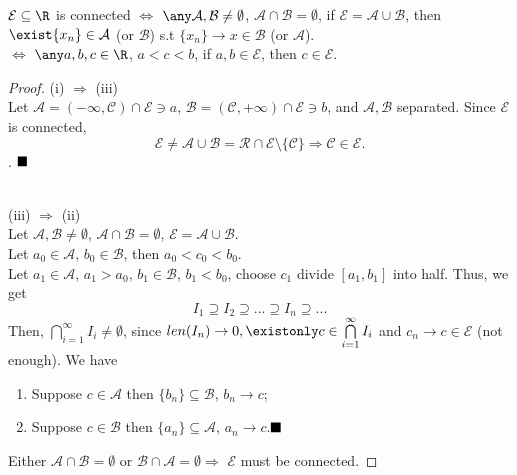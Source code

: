 \begin{theorem}
    $\mathcal{E} \subseteq \R$ is connected  $\Leftrightarrow$ $\any \mathcal{A,B} \neq \emptyset$, $\mathcal{A} \cap \mathcal{B} = \emptyset$, if $\mathcal{E} = \mathcal{A} \cup \mathcal{B}$, then $\exist \{ x_n \} \in \mathcal{A}$ (or $\mathcal{B}$) s.t $\{ x_n \} \rightarrow x \in \mathcal{B}$ (or $\mathcal{A}$).\\
    \indent \indent \indent \indent \indent \indent \indent \indent$\Leftrightarrow$ $\any a,b,c \in \R$, $a<c<b$, if $a,b \in \mathcal{E}$, then $c \in \mathcal{E}$.
\end{theorem}
\begin{proof}
    (i) $\Rightarrow$ (iii) \\
    Let $\mathcal{A} =  (-\infty, \mathcal{C}) \cap \mathcal{E} \ni a$, $\mathcal{B} = (\mathcal{C}, +\infty) \cap \mathcal{E} \ni b$, and $\mathcal{A, B}$ separated. Since $\mathcal{E}$ is connected, 
    \[
    \mathcal{E} \neq \mathcal{A} \cup \mathcal{B} = \mathcal{R} \cap \mathcal{E} \setminus \{\mathcal{C}\} \Rightarrow \mathcal{C} \in \mathcal{E}.
    \]. $\hfill\blacksquare$

\\
    (iii) $\Rightarrow$ (ii)\\
    Let $\mathcal{A, B} \neq \emptyset$, $\mathcal{A} \cap \mathcal{B} = \emptyset$, $\mathcal{E} = \mathcal{A} \cup \mathcal{B}$. \\
    Let $a_0 \in \mathcal{A}$, $b_0 \in \mathcal{B}$, then $a_0<c_0<b_0$. \\
    Let $a_1 \in \mathcal{A}$, $a_1>a_0$, $b_1 \in \mathcal{B}$, $b_1<b_0$, choose $c_1$ divide $[a_1,b_1]$ into half. Thus, we get
    \[
        I_1 \supseteq I_2 \supseteq...\supseteq I_n \supseteq...
    \]
    Then, $\bigcap\limits_{i=1}^\infty I_i \neq \emptyset$, since $len(I_n) \rightarrow 0, \existonly c \in \bigcap\limits_{i=1}^\infty I_i$ and $c_n \rightarrow c \in \mathcal{E}$ (not enough). We have 
    \begin{enumerate}
        \item Suppose $c \in \mathcal{A}$ then $\{b_n\} \subseteq \mathcal{B}$, $b_n \rightarrow c$;
        \item Suppose $c \in \mathcal{B}$ then $\{a_n\} \subseteq \mathcal{A}$, $a_n \rightarrow c$.$\hfill\blacksquare$
    \end{enumerate} 
    Either $\mathcal{A}\cap \mathcal{B} = \emptyset$ or $\mathcal{B} \cap \mathcal{A} = \emptyset \Rightarrow$ $\mathcal{E}$ must be connected.
\end{proof}
